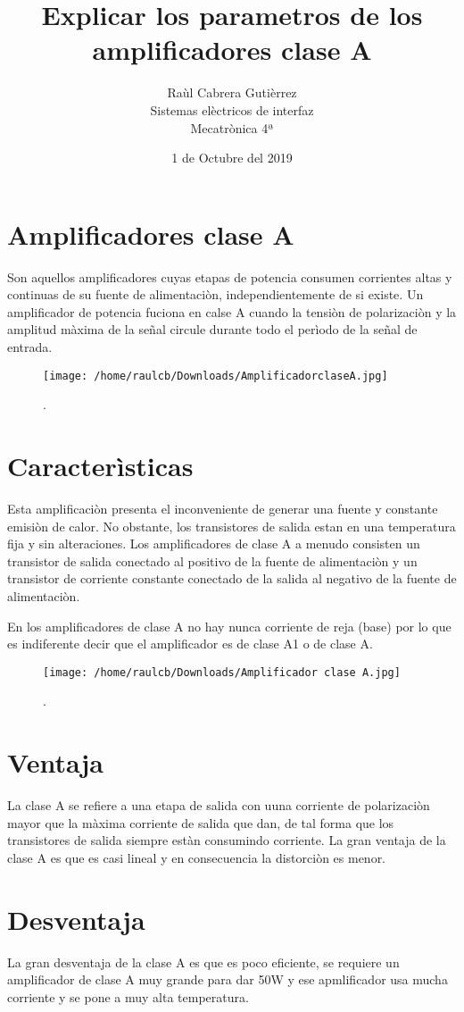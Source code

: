\documentclass[11pt]{article}
\title{\textbf{Explicar los parametros de los amplificadores clase A}}
\author{Raùl Cabrera Gutièrrez
    \\Sistemas elèctricos de interfaz
    \\Mecatrònica 4ª}
\date{1 de Octubre del 2019}
\begin{document}
\maketitle

\section{Amplificadores clase A}
Son aquellos amplificadores cuyas etapas de potencia consumen corrientes altas y continuas de su fuente de alimentaciòn, independientemente de si existe.
Un amplificador de potencia fuciona en calse A cuando la tensiòn de polarizaciòn y la amplitud màxima de la señal circule durante todo el perìodo de la señal de entrada.

\begin{figure}[htp]
\centering
\texttt{[image: /home/raulcb/Downloads/AmplificadorclaseA.jpg]}
\caption{.}
\label{.}
\end{figure}
\section{Caracterìsticas}
Esta amplificaciòn presenta el inconveniente de generar una fuente y constante emisiòn de calor. No obstante, los transistores de salida estan en una temperatura fija y sin alteraciones.
Los amplificadores de clase A a menudo consisten un transistor de salida conectado al positivo de la fuente de alimentaciòn y un transistor de corriente constante conectado de la salida al negativo de la fuente de alimentaciòn.

En los amplificadores de clase A no hay nunca corriente de reja (base) por lo que es indiferente decir que el amplificador es de clase A1 o de clase A.

\begin{figure}[htp]
\centering
\texttt{[image: /home/raulcb/Downloads/Amplificador clase A.jpg]}
\caption{.}
\label{.}
\end{figure}


\section{Ventaja}
La clase A se refiere a una etapa de salida con uuna corriente de polarizaciòn mayor que la màxima corriente de salida que dan, de tal forma que los transistores de salida siempre estàn consumindo corriente. La gran ventaja de la clase A es que es casi lineal y en consecuencia la distorciòn es menor.

\section{Desventaja}
La gran desventaja de la clase A es que es poco eficiente, se requiere un amplificador de clase A muy grande para dar 50W y ese apmlificador usa mucha corriente y se pone a muy alta temperatura.
\end{document}
